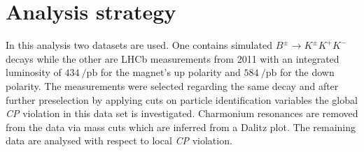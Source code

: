 \section{Analysis strategy}
\label{sec:Durchführung}
In this analysis two datasets are used. One contains simulated $B^\pm \to K^\pm K^+ K^-$ decays while the other are LHCb measurements from 2011 with an integrated luminosity of $\SI{434}{\per\pico\barn}$ for the magnet's up polarity and $\SI{584}{\per\pico\barn}$ for the down polarity. The measurements were selected regarding the same decay and after further preselection by applying cuts on particle identification variables the global \textit{CP} violation in this data set is investigated. Charmonium resonances are removed from the data via mass cuts which are inferred from a Dalitz plot. The remaining data are analysed with respect to local \textit{CP} violation.
